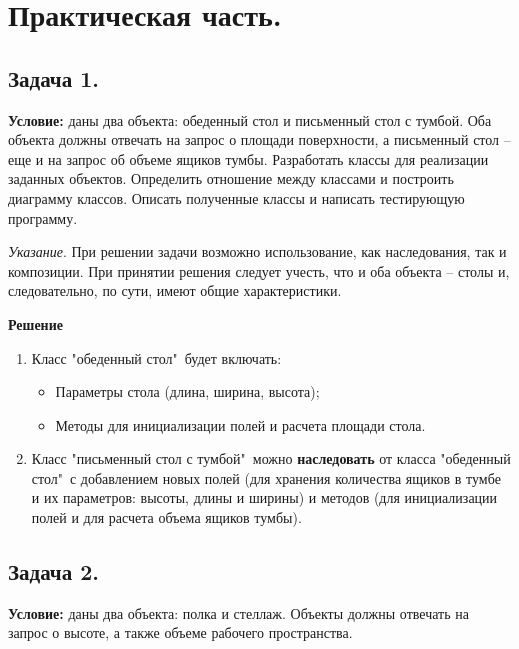 \newpage\section{Практическая часть.}
\subsection{Задача 1.}
{\bf Условие:} даны два объекта: обеденный стол и письменный стол с тумбой. Оба объекта должны отвечать на запрос о площади поверхности, а письменный стол – еще и на запрос об объеме ящиков тумбы. Разработать классы для реализации заданных объектов. Определить отношение между классами и построить диаграмму классов. Описать полученные классы и написать тестирующую программу. 

{\textit {Указание}}. При решении задачи возможно использование, как наследования, так и композиции. При принятии решения следует учесть, что и оба объекта – столы и, следовательно, по сути, имеют общие характеристики.

\noindent
{\bf Решение}
\begin{enumerate}
\item Класс "обеденный стол"\ будет включать:
\begin{itemize}
    \item Параметры стола (длина, ширина, высота);
    \item Методы для инициализации полей и расчета площади стола.
\end{itemize}

\item Класс "письменный стол с тумбой"\ можно {\bf наследовать} от класса "обеденный стол"\, с добавлением новых полей (для хранения количества ящиков в тумбе и их параметров: высоты, длины и ширины) и методов (для инициализации полей и для расчета объема ящиков тумбы). 
\end{enumerate}

{}


\newpage
{}



\newpage\subsection{Задача 2.}
{\bf Условие:} даны два объекта: полка и стеллаж. Объекты должны отвечать на запрос о высоте, а также 
объеме рабочего пространства.

